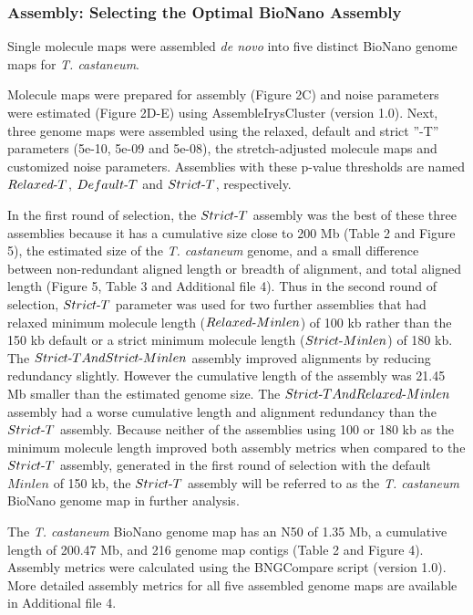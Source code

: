 \documentclass{bmcart}
\begin{document}
\subsubsection*{Assembly: Selecting the Optimal BioNano Assembly}
Single molecule maps were assembled \textit{de novo} into five distinct BioNano genome maps for \textit{T. castaneum}. 

Molecule maps were prepared for assembly (Figure 2C) and noise parameters were estimated (Figure 2D-E) using AssembleIrysCluster (version 1.0). Next, three genome maps were assembled using the relaxed, default and strict ”-T” parameters (5e-10, 5e-09 and 5e-08), the stretch-adjusted molecule maps and customized noise parameters. Assemblies with these p-value thresholds are named $Relaxed\textnormal{-}T$, $Default\textnormal{-}T$ and $Strict\textnormal{-}T$, respectively. 

In the first round of selection, the $Strict\textnormal{-}T$ assembly was the best of these three assemblies because it has a cumulative size close to 200 Mb (Table 2 and Figure 5), the estimated size of the \textit{T. castaneum} genome, and a small difference between non-redundant aligned length or breadth of alignment, and total aligned length (Figure 5, Table 3 and Additional file 4). Thus in the second round of selection, $Strict\textnormal{-}T$ parameter was used for two further assemblies that had relaxed minimum molecule length ($Relaxed\textnormal{-}Minlen$) of 100 kb rather than the 150 kb default or a strict minimum molecule length ($Strict\textnormal{-}Minlen$) of 180 kb. The $Strict\textnormal{-}TAndStrict\textnormal{-}Minlen$ assembly improved alignments by reducing redundancy slightly. However the cumulative length of the assembly was 21.45 Mb smaller than the estimated genome size. The $Strict\textnormal{-}TAndRelaxed\textnormal{-}Minlen$ assembly had a worse cumulative length and alignment redundancy than the $Strict\textnormal{-}T$ assembly. Because neither of the assemblies using 100 or 180 kb as the minimum molecule length improved both assembly metrics when compared to the $Strict\textnormal{-}T$ assembly, generated in the first round of selection with the default $Minlen$ of 150 kb, the $Strict\textnormal{-}T$ assembly will be referred to as the \textit{T. castaneum} BioNano genome map in further analysis.

The \textit{T. castaneum} BioNano genome map has an N50 of 1.35 Mb, a cumulative length of 200.47 Mb, and 216 genome map contigs (Table 2 and Figure 4). Assembly metrics were calculated using the BNGCompare script (version 1.0). More detailed assembly metrics for all five assembled genome maps are available in Additional file 4.
\end{document}
